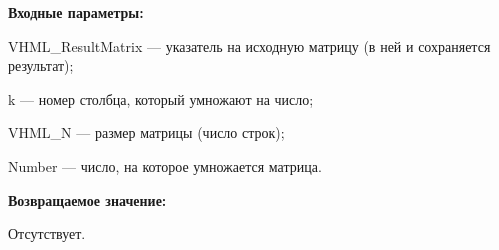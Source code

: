 \textbf{Входные параметры:}

 VHML\_ResultMatrix --- указатель на исходную матрицу (в ней и сохраняется результат);
 
 k --- номер столбца, который умножают на число;
 
 VHML\_N --- размер матрицы (число строк);
 
 Number --- число, на которое умножается матрица.

\textbf{Возвращаемое значение:}

Отсутствует.